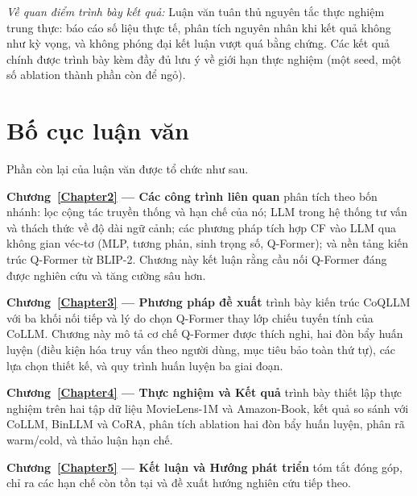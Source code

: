 \textit{Về quan điểm trình bày kết quả:} Luận văn tuân thủ nguyên tắc thực nghiệm trung
thực: báo cáo số liệu thực tế, phân tích nguyên nhân khi kết quả không như kỳ vọng, và
không phóng đại kết luận vượt quá bằng chứng. Các kết quả chính được trình bày kèm đầy đủ
lưu ý về giới hạn thực nghiệm (một seed, một số ablation thành phần còn để ngỏ).

\section{Bố cục luận văn}
\label{sec:bo-cuc}

Phần còn lại của luận văn được tổ chức như sau.

\textbf{Chương~\ref{Chapter2} --- Các công trình liên quan} phân tích theo bốn nhánh:
lọc cộng tác truyền thống và hạn chế của nó; LLM trong hệ thống tư vấn và thách thức
về độ dài ngữ cảnh; các phương pháp tích hợp CF vào LLM qua không gian véc-tơ (MLP,
tương phản, sinh trọng số, Q-Former); và nền tảng kiến trúc Q-Former từ BLIP-2. Chương
này kết luận rằng cầu nối Q-Former đáng được nghiên cứu và tăng cường sâu hơn.

\textbf{Chương~\ref{Chapter3} --- Phương pháp đề xuất} trình bày kiến trúc CoQLLM với
ba khối nối tiếp và lý do chọn Q-Former thay lớp chiếu tuyến tính của CoLLM. Chương này
mô tả cơ chế Q-Former được thích nghi, hai đòn bẩy huấn luyện (điều kiện hóa truy vấn
theo người dùng, mục tiêu bảo toàn thứ tự), các lựa chọn thiết kế, và quy trình huấn
luyện ba giai đoạn.

\textbf{Chương~\ref{Chapter4} --- Thực nghiệm và Kết quả} trình bày thiết lập thực
nghiệm trên hai tập dữ liệu MovieLens-1M và Amazon-Book, kết quả so sánh với CoLLM, BinLLM
và CoRA, phân tích ablation hai đòn bẩy huấn luyện, phân rã warm/cold, và thảo luận hạn chế.

\textbf{Chương~\ref{Chapter5} --- Kết luận và Hướng phát triển} tóm tắt đóng góp, chỉ
ra các hạn chế còn tồn tại và đề xuất hướng nghiên cứu tiếp theo.
